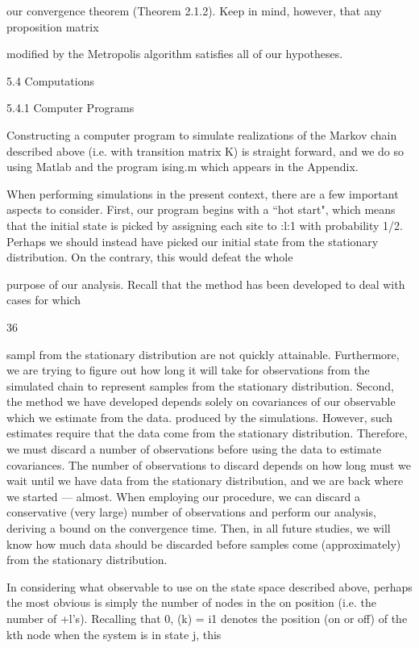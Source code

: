 {our convergence theorem (Theorem 2.1.2). Keep in mind, however, that any proposition matrix

modiﬁed by the Metropolis algorithm satisﬁes all of our hypotheses.

5.4 Computations

5.4.1 Computer Programs

Constructing a computer program to simulate realizations of the Markov chain described
above (i.e. with transition matrix K) is straight forward, and we do so using Matlab and the
program ising.m which appears in the Appendix.

When performing simulations in the present context, there are a few important aspects
to consider. First, our program begins with a “hot start", which means that the initial state is
picked by assigning each site to :l:1 with probability 1/2. Perhaps we should instead have picked
our initial state from the stationary distribution. On the contrary, this would defeat the whole

purpose of our analysis. Recall that the method has been developed to deal with cases for which

36

sampl from the stationary distribution are not quickly attainable. Furthermore, we are trying to
ﬁgure out how long it will take for observations from the simulated chain to represent samples from
the stationary distribution. Second, the method we have developed depends solely on covariances
of our observable which we estimate from the data. produced by the simulations. However, such
estimates require that the data come from the stationary distribution. Therefore, we must discard a
number of observations before using the data to estimate covariances. The number of observations
to discard depends on how long must we wait until we have data from the stationary distribution,
and we are back where we started — almost. When employing our procedure, we can discard a
conservative (very large) number of observations and perform our analysis, deriving a bound on
the convergence time. Then, in all future studies, we will know how much data should be discarded
before samples come (approximately) from the stationary distribution.

In considering what observable to use on the state space described above, perhaps the
most obvious is simply the number of nodes in the on position (i.e. the number of +l’s). Recalling
that 0, (k) = i1 denotes the position (on or off) of the kth node when the system is in state j, this

}

